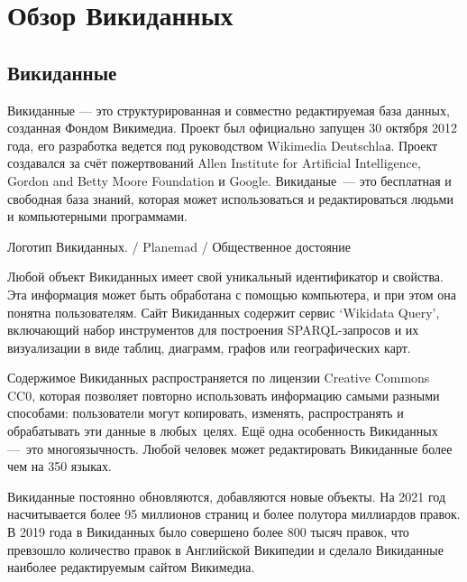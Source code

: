 \chapter{Обзор Викиданных}
\label{ch:ReviewAboutWD}

\section{Викиданные}
Викиданные — это структурированная и совместно редактируемая база данных, созданная Фондом Викимедиа\footnotemark {}. Проект был официально запущен 30 октября 2012 года, его разработка ведется под руководством Wikimedia Deutschlaа\footnotemark {}. Проект создавался за счёт пожертвований Allen Institute for Artificial Intelligence, Gordon and Betty Moore Foundation и Google. Викиданые — это бесплатная и свободная база знаний, которая может использоваться и редактироваться людьми и компьютерными программами\cite{Vrandecic}.\begin{marginfigure}[0.0cm]
{
	\setlength{\fboxsep}{0pt}%
	\setlength{\fboxrule}{1pt}%
}
\caption
{Логотип Викиданных.  / Planemad / Общественное достояние
}
\label{fig:seyu}
\end{marginfigure}

Любой объект Викиданных имеет свой уникальный идентификатор и свойства. Эта информация может быть обработана с помощью компьютера, и при этом она понятна пользователям. Сайт Викиданных содержит сервис ‘Wikidata Query’, включающий набор инструментов для построения SPARQL-запросов и их визуализации в виде таблиц, диаграмм, графов или географических карт.

Содержимое Викиданных распространяется по лицензии Creative Commons CC0, которая позволяет повторно использовать информацию самыми разными способами: пользователи могут копировать, изменять, распространять и обрабатывать эти данные в любых целях. Ещё одна особенность Викиданных --- это многоязычность. Любой человек может редактировать Викиданные более чем на 350 языках.

Викиданные постоянно обновляются, добавляются новые объекты. На 2021 год насчитывается более 95 миллионов страниц и более полутора миллиардов правок\footnotemark.  В 2019 года в Викиданных было совершено более 800 тысяч правок, что превзошло количество правок в Английской Википедии и сделало Викиданные наиболее редактируемым сайтом Викимедиа\footnotemark . 

